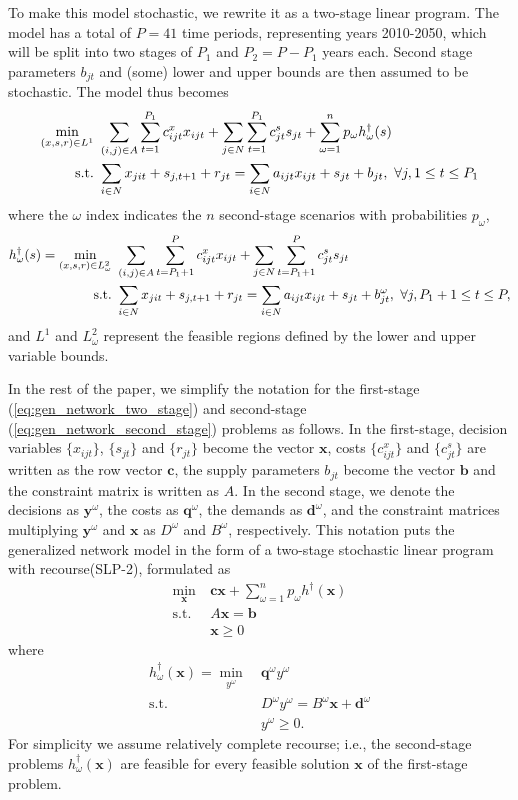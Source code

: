 \documentclass{iserc}
\newcommand{\x}{\mathbf{x}}
\newcommand{\y}{\mathbf{y}}
\renewcommand{\c}{\mathbf{c}}
\newcommand{\q}{\mathbf{q}}
\renewcommand{\b}{\mathbf{b}}
\renewcommand{\d}{\mathbf{d}}
\newcommand{\st}{\mbox{s.t.}}
\begin{document}
To make this model stochastic, we rewrite it as a two-stage linear program.
The model has a total of $P = 41$ time periods, representing years 2010-2050, which will be split into two stages of $P_1$ and $P_2 = P - P_1$ years each.
Second stage parameters $b_{jt}$ and (some) lower and upper bounds are then assumed to be stochastic.
The model thus becomes
\begin{align}
	\min_{(x,s,r) \in L^1} \ & \sum_{(i,j) \in A} \sum_{t=1}^{P_1} c_{ijt}^x x_{ijt} + \sum_{j \in N} \sum_{t=1}^{P_1} c_{jt}^s s_{jt} + \sum_{\omega=1}^n p_\omega h^\dagger_\omega(s) \label{eq:gen_network_two_stage} \\
	\st \ & \sum_{i \in N} x_{jit} + s_{j,t+1} + r_{jt} = \sum_{i \in N} a_{ijt} x_{ijt} + s_{jt} + b_{jt}, \ \forall j, 1 \leq t \leq P_1 \notag
\end{align}
where the $\omega$ index indicates the $n$ second-stage scenarios with probabilities $p_\omega$,
\begin{align}
	h^\dagger_\omega(s) = \min_{(x,s,r) \in L^2_\omega} \ & \sum_{(i,j) \in A} \sum_{t=P_1+1}^{P} c_{ijt}^x x_{ijt} + \sum_{j \in N} \sum_{t=P_1+1}^{P} c_{jt}^s s_{jt} \label{eq:gen_network_second_stage} \\
	\st \ & \sum_{i \in N} x_{jit} + s_{j,t+1} + r_{jt} = \sum_{i \in N} a_{ijt} x_{ijt} + s_{jt} + b_{jt}^\omega, \ \forall j, P_1+1 \leq t \leq P, \notag
\end{align}
and $L^1$ and $L^2_\omega$ represent the feasible regions defined by the lower and upper variable bounds.

In the rest of the paper, we simplify the notation for the first-stage (\ref{eq:gen_network_two_stage}) and second-stage (\ref{eq:gen_network_second_stage}) problems as follows.
In the first-stage, decision variables $\{x_{ijt}\}$, $\{s_{jt}\}$ and $\{r_{jt}\}$ become the vector $\x$, costs $\{c_{ijt}^x\}$ and $\{c_{jt}^s\}$ are written as the row vector $\c$, the supply parameters $b_{jt}$ become the vector $\b$ and the constraint matrix is written as $A$.
In the second stage, we denote the decisions as $\y^\omega$, the costs as $\q^\omega$, the demands as $\d^\omega$, and the constraint matrices multiplying $\y^\omega$ and $\x$ as $D^\omega$ and $B^\omega$, respectively.
This notation puts the generalized network model in the form of a two-stage stochastic linear program with recourse(SLP-2), formulated as
\begin{align}
	\min_\x \ & \c\x + \sum_{\omega=1}^n p_\omega h^\dagger(\x) \label{eq:slp_first_stage} \\
	\st \ & A\x = \b \nonumber  \\
	& \x \geq 0 \nonumber
\end{align}
where
\begin{align}
	h^\dagger_\omega(\x) = \min_{y^\omega} \ & \q^\omega y^\omega \label{eq:slp_second_stage} \\
	\st \ & D^\omega y^\omega = B^\omega \x + \d^\omega \nonumber \\
	& y^\omega \geq 0. \nonumber
\end{align}
For simplicity we assume relatively complete recourse; i.e., the second-stage problems $h^\dagger_\omega(\x)$ are feasible for every feasible solution $\x$ of the first-stage problem.
\end{document}
